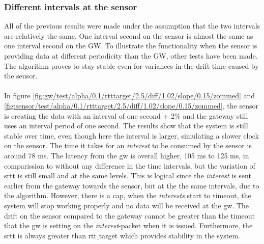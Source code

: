 \subsubsection{Different intervals at the sensor}
All of the previous results were made under the assumption that the two intervals are relatively the same. One interval second on the sensor is almost the same as one interval second on the GW. To illustrate the functionality when the sensor is providing data at different periodicity than the GW, other tests have been made. The algorithm proves to stay stable even for variances in the drift time caused by the sensor. \\\\
In figure \ref{fig:gw/test/alpha/0.1/rtttarget/2.5/diff/1.02/slope/0.15/zommed} and \ref{fig:sensor/test/alpha/0.1/rtttarget/2.5/diff/1.02/slope/0.15/zommed}, the sensor is creating the data with an interval of one second + 2$\%$ and the gateway still uses an interval period of one second. The results show that the system is still stable over time, even though here the interval is larger, simulating a slower clock on the sensor. The time it takes for an \textit{interest} to be consumed by the sensor is around 78 ms. The latency from the gw is overall higher, 105 ms to 125 ms, in comparission to without any difference in the time intervals, but the variation of srtt is still small and at the same levels. This is logical since the \textit{interest} is sent earlier from the gateway towards the sensor, but at the the same intervals, due to the algorithm. However, there is a cap, when the \textit{interests} start to timeout, the system will stop working properly and no data will be received at the gw. The drift on the sensor compared to the gateway cannot be greater than the timeout that the gw is setting on the \textit{interest}-packet when it is issued. Furthermore, the srtt is always greater than rtt$\_$target which provides stability in the system.\\\\
